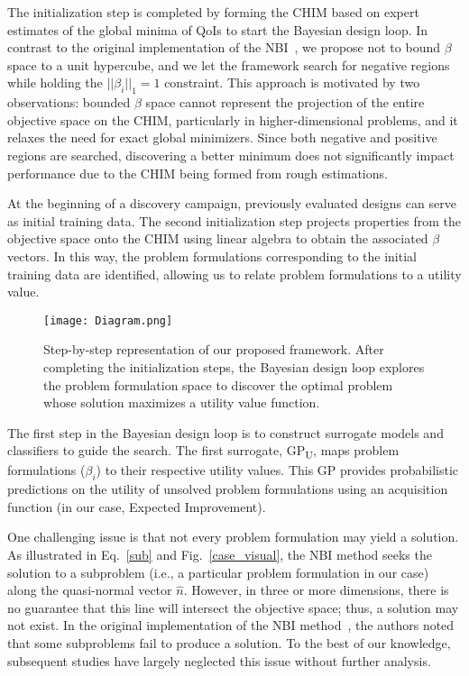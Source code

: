 \documentclass[final,5p,times,twocolumn]{elsarticle}
\begin{document}
The initialization step is completed by forming the CHIM based on expert estimates of the global minima of QoIs to start the Bayesian design loop. In contrast to the original implementation of the NBI~\cite{das1997nonlinear,doi:10.1137/S1052623496307510}, we propose not to bound $\beta$ space to a unit hypercube, and we let the framework search for negative regions while holding the $||\beta_i||_1=1$ constraint. This approach is motivated by two observations: bounded $\beta$ space cannot represent the projection of the entire objective space on the CHIM, particularly in higher-dimensional problems, and it relaxes the need for exact global minimizers. Since both negative and positive regions are searched, discovering a better minimum does not significantly impact performance due to the CHIM being formed from rough estimations.

At the beginning of a discovery campaign, previously evaluated designs can serve as initial training data. The second initialization step projects properties from the objective space onto the CHIM using linear algebra to obtain the associated $\beta$ vectors. In this way, the problem formulations corresponding to the initial training data are identified, allowing us to relate problem formulations to a utility value.

\begin{figure*}[htb!]
\centering
\texttt{[image: Diagram.png]}
\caption{Step-by-step representation of our proposed framework. After completing the initialization steps, the Bayesian design loop explores the problem formulation space to discover the optimal problem whose solution maximizes a utility value function.}
\label{diagram}
\end{figure*}

The first step in the Bayesian design loop is to construct surrogate models and classifiers to guide the search. The first surrogate, GP\textsubscript{U}, maps problem formulations ($\beta_i$) to their respective utility values. This GP provides probabilistic predictions on the utility of unsolved problem formulations using an acquisition function (in our case, Expected Improvement).

One challenging issue is that not every problem formulation may yield a solution. As illustrated in Eq.~\ref{sub} and Fig.~\ref{case_visual}, the NBI method seeks the solution to a subproblem (i.e., a particular problem formulation in our case) along the quasi-normal vector $\hat{n}$. However, in three or more dimensions, there is no guarantee that this line will intersect the objective space; thus, a solution may not exist. In the original implementation of the NBI method~\cite{das1997nonlinear,doi:10.1137/S1052623496307510}, the authors noted that some subproblems fail to produce a solution. To the best of our knowledge, subsequent studies have largely neglected this issue without further analysis.
\end{document}
